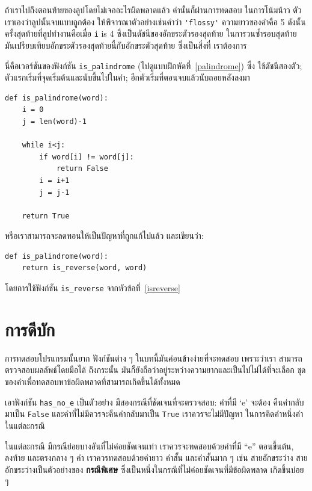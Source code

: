 ถ้าเราไปถึงตอนท้ายของลูปโดยไม่เจออะไรผิดพลาดแล้ว คำนั้นก็ผ่านการทดสอบ ในการโน้มน้าว
ตัวเราเองว่าลูปนั้นจบแบบถูกต้อง ให้พิจารณาตัวอย่างเช่นคำว่า \verb"'flossy'" ความยาวของคำคือ 5
ดังนั้น ครั้งสุดท้ายที่ลูปทำงานคือเมื่อ {\tt i} is 4 ซึ่งเป็นดัชนีของอักขระตัวรองสุดท้าย
ในการวนซ้ำรอบสุดท้าย มันเปรียบเทียบอักขระตัวรองสุดท้ายนี้กับอักขระตัวสุดท้าย ซึ่งเป็นสิ่งที่
เราต้องการ


นี่คือเวอร์ชันของฟังก์ชัน \verb"is_palindrome" (ไปดูแบบฝึกหัดที่~\ref{palindrome}) ซึ่ง
ใช้ดัชนีสองตัว; ตัวแรกเริ่มที่จุดเริ่มต้นและนับขึ้นไปในคำ; อีกตัวเริ่มที่ตอนจบแล้วนับถอยหลังลงมา

\begin{verbatim}
def is_palindrome(word):
    i = 0
    j = len(word)-1

    while i<j:
        if word[i] != word[j]:
            return False
        i = i+1
        j = j-1

    return True
\end{verbatim}

หรือเราสามารถจะลดทอนให้เป็นปัญหาที่ถูกแก้ไปแล้ว และเขียนว่า:

\begin{verbatim}
def is_palindrome(word):
    return is_reverse(word, word)
\end{verbatim}
%
โดยการใช้ฟังก์ชัน \verb"is_reverse" จากหัวข้อที่~\ref{isreverse}


\section{การดีบัก}

การทดสอบโปรแกรมนั้นยาก ฟังก์ชันต่าง ๆ ในบทนี้มันค่อนข้างง่ายที่จะทดสอบ เพราะว่าเรา
สามารถตรวจสอบผลลัพธ์โดยมือได้ ถึงกระนั้น มันก็ยังถือว่าอยู่ระหว่างความยากและเป็นไปไม่ได้ที่จะเลือก
ชุดของคำเพื่อทดสอบหาข้อผิดพลาดที่สามารถเกิดขึ้นได้ทั้งหมด

เอาฟังก์ชัน \verb"has_no_e" เป็นตัวอย่าง มีสองกรณีที่ชัดเจนที่จะตรวจสอบ: คำที่มี `e' จะต้อง
คืนค่ากลับมาเป็น {\tt False} และคำที่ไม่มีควรจะคืนค่ากลับมาเป็น {\tt True} เราควรจะไม่มีปัญหา
ในการคิดคำหนึ่งคำในแต่ละกรณี

ในแต่ละกรณี มีกรณีย่อยบางอันที่ไม่ค่อยชัดเจนเท่า เราควรจะทดสอบด้วยคำที่มี ``e'' ตอนขึ้นต้น,
ลงท้าย และตรงกลาง ๆ คำ เราควรทดสอบด้วยคำยาว คำสั้น และคำสั้นมาก ๆ เช่น สายอักขระว่าง
สายอักขระว่างเป็นตัวอย่างของ {\bf กรณีพิเศษ} ซึ่งเป็นหนึ่งในกรณีที่ไม่ค่อยชัดเจนที่มีข้อผิดพลาด
เกิดขึ้นบ่อย ๆ


